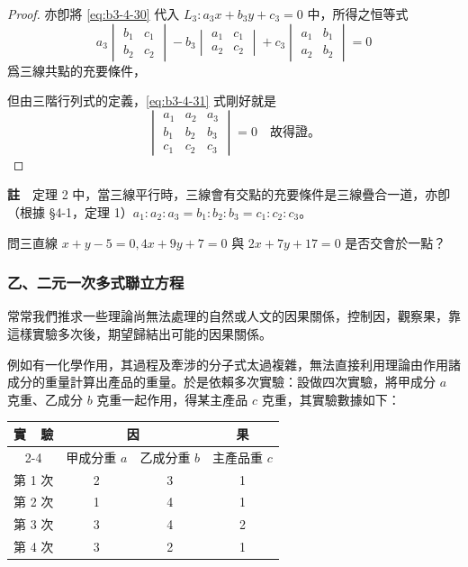\begin{proof}
亦卽將 \eqref{eq:b3-4-30} 代入 $L_3 : a_3 x + b_3 y + c_3 = 0$ 中，所得之恒等式
\begin{equation}
a_3 \begin{vmatrix} b_1 & c_1 \\ b_2 & c_2 \end{vmatrix} - b_3 \begin{vmatrix} a_1 & c_1 \\ a_2 & c_2 \end{vmatrix} + c_3 \begin{vmatrix} a_1 & b_1 \\ a_2 & b_2 \end{vmatrix} = 0
\label{eq:b3-4-31}
\end{equation}
爲三線共點的充要條件，

但由三階行列式的定義，\eqref{eq:b3-4-31} 式剛好就是
\[
\begin{vmatrix}
a_1 & a_2 & a_3 \\
b_1 & b_2 & b_3 \\
c_1 & c_2 & c_3
\end{vmatrix} = 0 \quad \text{故得證。}
\]
\end{proof}

\noindent\textbf{註}~~定理 2 中，當三線平行時，三線會有交點的充要條件是三線疊合一道，亦卽（根據 \S 4-1，定理 1）$a_1 : a_2 : a_3 = b_1 : b_2 : b_3 = c_1 : c_2 : c_3$。

\begin{exercise}[作業 22]
問三直線 $x + y - 5 = 0, 4x + 9y + 7 = 0$ 與 $2x + 7y + 17 = 0$ 是否交會於一點？
\end{exercise}

\subsubsection*{乙、二元一次多式聯立方程}

常常我們推求一些理論尚無法處理的自然或人文的因果關係，控制因，觀察果，靠這樣實驗多次後，期望歸結出可能的因果關係。

例如有一化學作用，其過程及牽涉的分子式太過複雜，無法直接利用理論由作用諸成分的重量計算出產品的重量。於是依賴多次實驗：設做四次實驗，將甲成分 $a$ 克重、乙成分 $b$ 克重一起作用，得某主產品 $c$ 克重，其實驗數據如下：

\begin{table}[H]
\centering
\begin{tabular}{|c|c|c|c|}
\hline
\multirow{2}{*}{實~~驗} & \multicolumn{2}{c|}{因} & 果 \\
\cline{2-4}
 & 甲成分重 $a$ & 乙成分重 $b$ & 主產品重 $c$ \\
\hline
第 1 次 & 2 & 3 & 1 \\
第 2 次 & 1 & 4 & 1 \\
第 3 次 & 3 & 4 & 2 \\
第 4 次 & 3 & 2 & 1 \\
\hline
\end{tabular}
\end{table}

